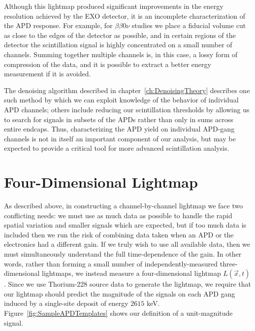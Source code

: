 Although this lightmap produced significant improvements in the energy resolution achieved by the EXO detector,  it is an incomplete characterization of the APD response.  For example, for $\beta\beta0\nu$ studies we place a fiducial volume cut as close to the edges of the detector as possible, and in certain regions of the detector the scintillation signal is highly concentrated on a small number of channels.  Summing together multiple channels is, in this case, a lossy form of compression of the data, and it is possible to extract a better energy measurement if it is avoided.  

The denoising algorithm described in chapter~\ref{ch:DenoisingTheory} describes one such method by which we can exploit knowledge of the behavior of individual APD channels; others include reducing our scintillation thresholds by allowing us to search for signals in subsets of the APDs rather than only in sums across entire endcaps.  Thus, characterizing the APD yield on individual APD-gang channels is not in itself an important component of our analysis, but may be expected to provide a critical tool for more advanced scintillation analysis.

\section{Four-Dimensional Lightmap}

As described above, in constructing a channel-by-channel lightmap we face two conflicting needs: we must use as much data as possible to handle the rapid spatial variation and smaller signals which are expected, but if too much data is included then we run the risk of combining data taken when an APD or the electronics had a different gain.  If we truly wish to use all available data, then we must simultaneously understand the full time-dependence of the gain.  In other words, rather than forming a small number of independently-measured three-dimensional lightmaps, we instead measure a four-dimensional lightmap $L(\vec{x},t)$.  Since we use Thorium-228 source data to generate the lightmap, we require that our lightmap should predict the magnitude of the signals on each APD gang induced by a single-site deposit of energy $2615$ keV.  Figure~\ref{fig:SampleAPDTemplates} shows our definition of a unit-magnitude signal.

